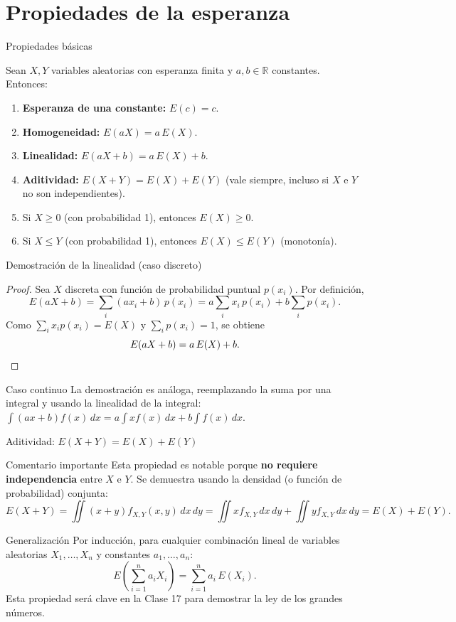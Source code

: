 \documentclass[aspectratio=169,11pt]{beamer}
\begin{document}
\section{Propiedades de la esperanza}

\begin{frame}{Propiedades básicas}
\begin{theorem}
Sean $X, Y$ variables aleatorias con esperanza finita y $a, b \in \mathbb{R}$ constantes. Entonces:
\begin{enumerate}
\item \textbf{Esperanza de una constante:} $E(c) = c$.
\item \textbf{Homogeneidad:} $E(aX) = a\, E(X)$.
\item \textbf{Linealidad:} $E(aX + b) = a\,E(X) + b$.
\item \textbf{Aditividad:} $E(X+Y) = E(X) + E(Y)$ (vale siempre, incluso si $X$ e $Y$ no son independientes).
\item Si $X \geq 0$ (con probabilidad 1), entonces $E(X) \geq 0$.
\item Si $X \leq Y$ (con probabilidad 1), entonces $E(X) \leq E(Y)$ (monotonía).
\end{enumerate}
\end{theorem}
\end{frame}

\begin{frame}{Demostración de la linealidad (caso discreto)}
\begin{proof}
Sea $X$ discreta con función de probabilidad puntual $p(x_i)$. Por definición,
\[
E(aX+b) = \sum_i (a x_i + b)\, p(x_i) = a \sum_i x_i\, p(x_i) + b \sum_i p(x_i).
\]
Como $\sum_i x_i p(x_i) = E(X)$ y $\sum_i p(x_i) = 1$, se obtiene
\[
E(aX+b) = a\, E(X) + b. \qedhere
\]
\end{proof}

\begin{block}{Caso continuo}
La demostración es análoga, reemplazando la suma por una integral y usando la linealidad de la integral: $\int (ax+b)f(x)\,dx = a\int x f(x)\,dx + b \int f(x)\,dx$.
\end{block}
\end{frame}

\begin{frame}{Aditividad: $E(X+Y) = E(X)+E(Y)$}
\begin{block}{Comentario importante}
Esta propiedad es notable porque \textbf{no requiere independencia} entre $X$ e $Y$. Se demuestra usando la densidad (o función de probabilidad) conjunta:
\[
E(X+Y) = \iint (x+y) f_{X,Y}(x,y)\, dx\, dy = \iint x f_{X,Y}\, dx\,dy + \iint y f_{X,Y}\,dx\,dy = E(X) + E(Y).
\]
\end{block}

\begin{alertblock}{Generalización}
Por inducción, para cualquier combinación lineal de variables aleatorias $X_1,\dots,X_n$ y constantes $a_1,\dots,a_n$:
\[
E\left(\sum_{i=1}^n a_i X_i\right) = \sum_{i=1}^n a_i\, E(X_i).
\]
Esta propiedad será clave en la Clase 17 para demostrar la ley de los grandes números.
\end{alertblock}
\end{frame}
\end{document}

